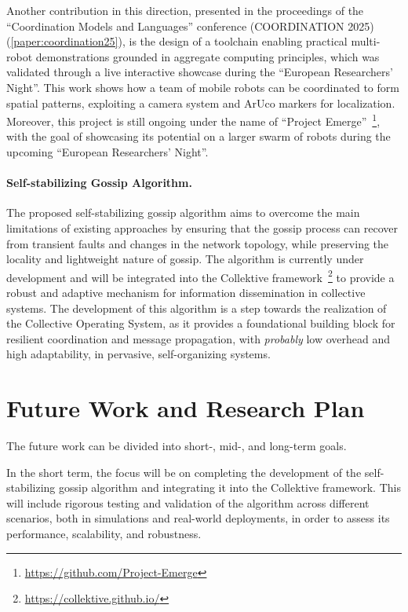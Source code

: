 \documentclass[runningheads]{llncs}
\begin{document}
    Another contribution in this direction, presented in the proceedings of the ``Coordination Models and Languages''
    conference (COORDINATION 2025)~\cite{DBLP:conf/coordination/AguzziBBCCDFPV25} (\cref{paper:coordination25}),
    is the design of a toolchain enabling practical multi-robot demonstrations grounded in aggregate computing principles,
    which was validated through a live interactive showcase during the ``European Researchers’ Night''.
    This work shows how a team of mobile robots can be coordinated to form spatial patterns,
    exploiting a camera system and ArUco markers for localization.
    Moreover,
    this project is still ongoing under the name of ``Project Emerge''~\footnote{\url{https://github.com/Project-Emerge}},
    with the goal of showcasing its potential on a larger swarm of robots during the upcoming ``European Researchers’ Night''.

    \paragraph{Self-stabilizing Gossip Algorithm.}

    The proposed self-stabilizing gossip algorithm aims to overcome the main limitations of existing approaches
    by ensuring that the gossip process can recover from transient faults and changes in the network topology,
    while preserving the locality and lightweight nature of gossip.
%
    The algorithm is currently under development and will be integrated into the Collektive framework~\footnote{\url{https://collektive.github.io/}}
    to provide a robust and adaptive mechanism for information dissemination in collective systems.
    The development of this algorithm is a step towards the realization of the Collective Operating System,
    as it provides a foundational building block for resilient coordination and message propagation,
    with \emph{probably} low overhead and high adaptability, in pervasive, self-organizing systems.

    \section{Future Work and Research Plan}\label{sec:future}

    The future work can be divided into short-, mid-, and long-term goals.

    In the short term,
    the focus will be on completing the development of the self-stabilizing gossip algorithm
    and integrating it into the Collektive framework.
%
    This will include rigorous testing and validation of the algorithm across different scenarios,
    both in simulations and real-world deployments,
    in order to assess its performance, scalability, and robustness.
\end{document}
